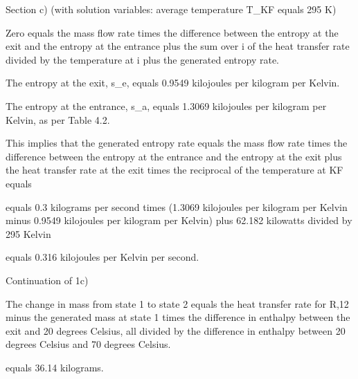 Section c) (with solution variables: average temperature T_KF equals 295 K)

Zero equals the mass flow rate times the difference between the entropy at the exit and the entropy at the entrance plus the sum over i of the heat transfer rate divided by the temperature at i plus the generated entropy rate.

The entropy at the exit, s_e, equals 0.9549 kilojoules per kilogram per Kelvin.

The entropy at the entrance, s_a, equals 1.3069 kilojoules per kilogram per Kelvin, as per Table 4.2.

This implies that the generated entropy rate equals the mass flow rate times the difference between the entropy at the entrance and the entropy at the exit plus the heat transfer rate at the exit times the reciprocal of the temperature at KF equals

equals 0.3 kilograms per second times (1.3069 kilojoules per kilogram per Kelvin minus 0.9549 kilojoules per kilogram per Kelvin) plus 62.182 kilowatts divided by 295 Kelvin

equals 0.316 kilojoules per Kelvin per second.

Continuation of 1c)

The change in mass from state 1 to state 2 equals the heat transfer rate for R,12 minus the generated mass at state 1 times the difference in enthalpy between the exit and 20 degrees Celsius, all divided by the difference in enthalpy between 20 degrees Celsius and 70 degrees Celsius.

equals 36.14 kilograms.